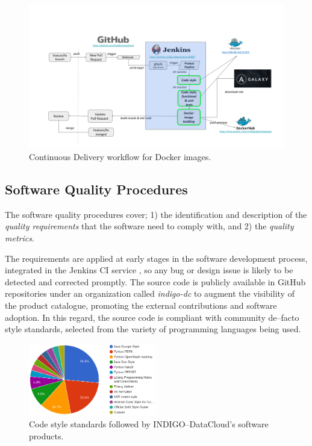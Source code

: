 \documentclass[journal]{IEEEtran}
\begin{document}
\begin{figure}
\centering
\includegraphics[width=\textwidth]{images/devops.png}
\caption{Continuous Delivery workflow for Docker images.}
\label{fig:fig_CD}
\end{figure}

\subsection{Software Quality Procedures}

The software quality procedures \cite{indigo-d31} cover; 1) the identification and description of the \emph{quality requirements} that the software need to comply with, and 2) the \emph{quality metrics}.

The requirements are applied at early stages in the software development process, integrated in the Jenkins CI service \cite{indigo-jenkins}, so any bug or design issue is likely to be detected and corrected promptly. The source code is publicly available in GitHub repositories under an organization called {\sl indigo-dc} \cite{indigo-github} to augment the visibility of the product catalogue, promoting the external contributions and software adoption. In this regard, the source code is compliant with community de--facto style standards, selected from the variety of programming languages being used.

\begin{figure}[!t]
\centering
\includegraphics[width=0.5\textwidth]{images/codestyle.png}
\caption{Code style standards followed by INDIGO--DataCloud's software products.}
\label{fig:fig_codestyle}
\end{figure}
\end{document}
